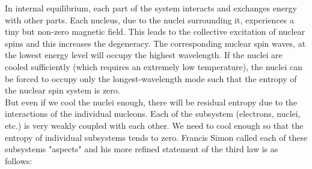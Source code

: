 \documentclass{article}
\begin{document}
	In internal equilibrium, each part of the system interacts and exchanges energy with other parts. Each nucleus, due to the nuclei surrounding it, experiences a tiny but non-zero magnetic field. This leads to the collective excitation of nuclear spins and this increases the degeneracy. The corresponding nuclear spin waves, at the lowest energy level will occupy the highest wavelength. If the nuclei are cooled sufficiently (which requires an extremely low temperature), the nuclei can be forced to occupy only the longest-wavelength mode such that the entropy of the nuclear spin system is zero.\\
	
	But even if we cool the nuclei enough, there will be residual entropy due to the interactions of the individual nucleons. Each of the subsystem (electrons, nuclei, etc.) is very weakly coupled with each other. We need to cool enough so that the entropy of individual subsystems tends to zero. Francis Simon called each of these subsystems "aspects" and his more refined statement of the third law is as follows:\\
	
	\noindent{}
\end{document}
